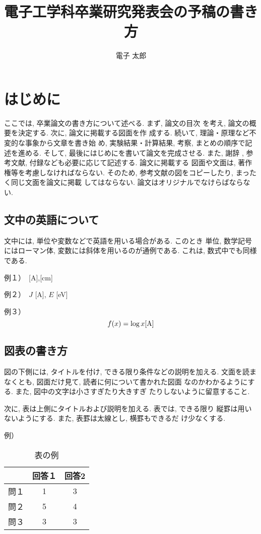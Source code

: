 \documentclass{jarticle}
\title{電子工学科卒業研究発表会の予稿の書き方} %
\author{電子 太郎}%
\begin{document}
%
\maketitle %

\section{はじめに}%
ここでは, 卒業論文の書き方について述べる. まず, 論文の目次
を考え, 論文の概要を決定する. 次に, 論文に掲載する図面を作
成する. 続いて, 理論・原理など不変的な事象から文章を書き始
め, 実験結果・計算結果, 考察, まとめの順序で記述を進める. 
そして, 最後にはじめにを書いて論文を完成させる. また, 謝辞
, 参考文献, 付録なども必要に応じて記述する. 論文に掲載する
図面や文面は, 著作権等を考慮しなければならない. そのため, 
参考文献の図をコピーしたり, まったく同じ文面を論文に掲載
してはならない. 論文はオリジナルでなけらばならない. 
\subsection{文中の英語について}%
文中には, 単位や変数などで英語を用いる場合がある. このとき
単位, 数学記号にはローマン体, 変数には斜体を用いるのが通例である. 
これは, 数式中でも同様である. \par
例１）　[A],[cm] \par
例２）　$J$ [A], $E$ [eV] \par
例３）
\begin{equation}
f(x) = \log x {\rm [A]}  
\end{equation}

\subsection{図表の書き方}%
図の下側には, タイトルを付け, できる限り条件などの説明を加える. 
文面を読まなくとも, 図面だけ見て, 読者に何について書かれた図面
なのかわかるようにする. また, 図中の文字は小さすぎたり大きすぎ
たりしないように留意すること\cite{ref:1}. \par%
次に, 表は上側にタイトルおよび説明を加える. 表では, できる限り
縦罫は用いないようにする. また, 表罫は太線とし, 横罫もできるだ
け少なくする. \par%
例）
\begin{table}[h]
  \begin{center}
  \caption{表の例}%
    \begin{tabular}{ccc} \hline
         & 回答１ & 回答2 \\ \hline
    問１ & 1 &  3 \\
    問２ & 5 &  4 \\  
    問３ & 3 &  3 \\ \hline
    \end{tabular}
  \end{center}
\end{table}
\end{document}
